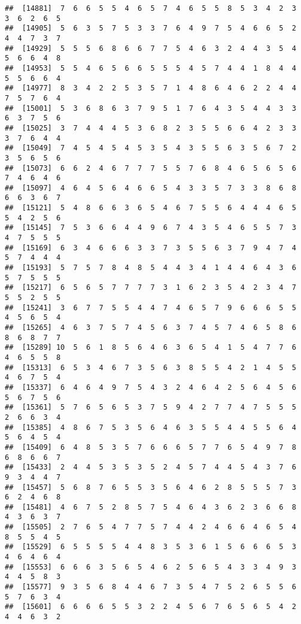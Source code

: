 \documentclass[
]{book}
\begin{document}
\begin{verbatim}
##  [14881]  7  6  6  5  5  4  6  5  7  4  6  5  5  8  5  3  4  2  3  3  6  2  6  5
##  [14905]  5  6  3  5  7  5  3  3  7  6  4  9  7  5  4  6  6  5  2  4  4  7  3  7
##  [14929]  5  5  5  6  8  6  6  7  7  5  4  6  3  2  4  4  3  5  4  5  6  6  4  8
##  [14953]  5  5  4  6  5  6  6  5  5  5  4  5  7  4  4  1  8  4  4  5  5  6  6  4
##  [14977]  8  3  4  2  2  5  3  5  7  1  4  8  6  4  6  2  2  4  4  7  5  7  6  4
##  [15001]  5  3  6  8  6  3  7  9  5  1  7  6  4  3  5  4  4  3  3  6  3  7  5  6
##  [15025]  3  7  4  4  4  5  3  6  8  2  3  5  5  6  6  4  2  3  3  3  7  6  4  4
##  [15049]  7  4  5  4  5  4  5  3  5  4  3  5  5  6  3  5  6  7  2  3  5  6  5  6
##  [15073]  6  6  2  4  6  7  7  7  5  5  7  6  8  4  6  5  6  5  6  7  4  6  4  6
##  [15097]  4  6  4  5  6  4  6  6  5  4  3  3  5  7  3  3  8  6  8  6  6  3  6  7
##  [15121]  5  4  8  6  6  3  6  5  4  6  7  5  5  6  4  4  4  6  5  5  4  2  5  6
##  [15145]  7  5  3  6  6  4  4  9  6  7  4  3  5  4  6  5  5  7  3  4  7  5  5  5
##  [15169]  6  3  4  6  6  6  3  3  7  3  5  5  6  3  7  9  4  7  4  5  7  4  4  4
##  [15193]  5  7  5  7  8  4  8  5  4  4  3  4  1  4  4  6  4  3  6  5  7  5  5  5
##  [15217]  6  5  6  5  7  7  7  7  3  1  6  2  3  5  4  2  3  4  7  5  5  2  5  5
##  [15241]  3  6  7  7  5  5  4  4  7  4  6  5  7  9  6  6  6  5  5  4  5  6  5  4
##  [15265]  4  6  3  7  5  7  4  5  6  3  7  4  5  7  4  6  5  8  6  8  6  8  7  7
##  [15289] 10  5  6  1  8  5  6  4  6  3  6  5  4  1  5  4  7  7  6  4  6  5  5  8
##  [15313]  6  5  3  4  6  7  3  5  6  3  8  5  5  4  2  1  4  5  5  4  6  7  5  4
##  [15337]  6  4  6  4  9  7  5  4  3  2  4  6  4  2  5  6  4  5  6  5  6  7  5  6
##  [15361]  5  7  6  5  6  5  3  7  5  9  4  2  7  7  4  7  5  5  5  2  6  6  3  4
##  [15385]  4  8  6  7  5  3  5  6  4  6  3  5  5  4  4  5  5  6  4  5  6  4  5  4
##  [15409]  6  4  8  5  3  5  7  6  6  6  5  7  7  6  5  4  9  7  8  6  8  6  6  7
##  [15433]  2  4  4  5  3  5  3  5  2  4  5  7  4  4  5  4  3  7  6  9  3  4  4  7
##  [15457]  5  6  8  7  6  5  5  3  5  6  4  6  2  8  5  5  5  7  3  6  2  4  6  8
##  [15481]  4  6  7  5  2  8  5  7  5  4  6  4  3  6  2  3  6  6  8  4  3  6  3  7
##  [15505]  2  7  6  5  4  7  7  5  7  4  4  2  4  6  6  4  6  5  4  8  5  5  4  5
##  [15529]  6  5  5  5  5  4  4  8  3  5  3  6  1  5  6  6  6  5  3  4  6  4  6  4
##  [15553]  6  6  6  3  5  6  5  4  6  2  5  6  5  4  3  3  4  9  3  4  4  5  8  3
##  [15577]  9  3  5  6  8  4  4  6  7  3  5  4  7  5  2  6  5  5  6  5  7  6  3  4
##  [15601]  6  6  6  6  5  5  3  2  2  4  5  6  7  6  5  6  5  4  2  4  4  6  3  2

\end{verbatim}
\end{document}
